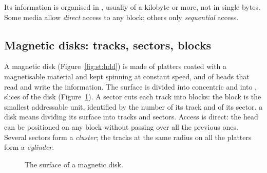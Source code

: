 Its information is organised in , usually of a kilobyte or more,
not in single bytes. Some media allow \emph{direct} access to any block;
others only \emph{sequential} access.

\subsection{Magnetic disks: tracks, sectors, blocks}

A magnetic disk (Figure~\ref{fig:st:hdd}) is made of platters coated with a
magnetisable material and kept spinning at constant speed, and of heads that
read and write the information. The surface is divided into concentric
 and into , slices of the disk
(Figure~\ref{fig:st:disk}). A sector cuts each track into blocks: the block
is the smallest addressable unit, identified by the number of its track and
of its sector.  a disk means dividing its surface into
tracks and sectors. Access is direct: the head can be positioned on any block
without passing over all the previous ones. Several sectors form a
\emph{cluster}; the tracks at the same radius on all the platters form a
\emph{cylinder}.

\begin{figure}[htb]
\centering
{}
\caption{The surface of a magnetic disk.}
\label{fig:st:disk}
\end{figure}

